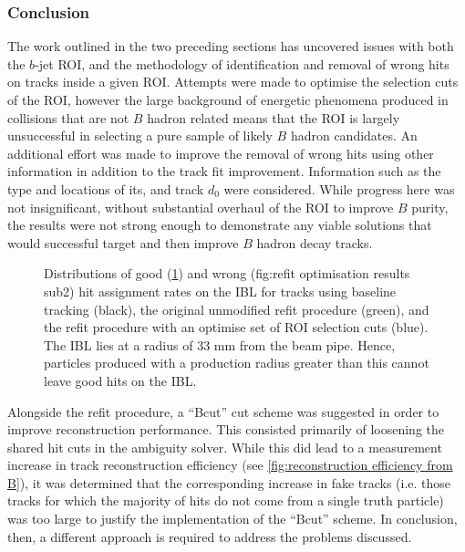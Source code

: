 \subsubsection{Conclusion}
The work outlined in the two preceding sections has uncovered issues with both the $b$-jet ROI, and the methodology of identification and removal of wrong hits on tracks inside a given ROI. Attempts were made to optimise the selection cuts of the ROI, however the large background of energetic phenomena produced in collisions that are not $B$ hadron related means that the ROI is largely unsuccessful in selecting a pure sample of likely $B$ hadron candidates. An additional effort was made to improve the removal of wrong hits using other information in addition to the track fit improvement. Information such as the type and locations of its, and track $d_0$ were considered. While progress here was not insignificant, without substantial overhaul of the ROI to improve $B$ purity, the results were not strong enough to demonstrate any viable solutions that would successful target and then improve $B$ hadron decay tracks.
%
\begin{figure}[!htbp]
    \centering
    \begin{subfigure}{.4\textwidth}
      \centering
      \caption{}
      \label{fig:refit optimisation results sub1}
    \end{subfigure}%
    \begin{subfigure}{.4\textwidth}
      \centering
      \caption{}
      \label{fig:refit optimisation results sub2}
    \end{subfigure}
    \caption{Distributions of good (\cref{fig:refit optimisation results sub1}) and wrong (fig:refit optimisation results sub2) hit assignment rates on the IBL for tracks using baseline tracking (black), the original unmodified refit procedure (green), and the refit procedure with an optimise set of ROI selection cuts (blue). The IBL lies at a radius of 33 mm from the beam pipe. Hence, particles produced with a production radius greater than this cannot leave good hits on the IBL.}
    \label{fig:refit optimisation results}
\end{figure}
%
Alongside the refit procedure, a ``Bcut'' cut scheme was suggested in order to improve reconstruction performance. This consisted primarily of loosening the shared hit cuts in the ambiguity solver. While this did lead to a measurement increase in track reconstruction efficiency (see \cref{fig:reconstruction efficiency from B}), it was determined that the corresponding increase in fake tracks (i.e. those tracks for which the majority of hits do not come from a single truth particle) was too large to justify the implementation of the ``Bcut'' scheme. In conclusion, then, a different approach is required to address the problems discussed.




